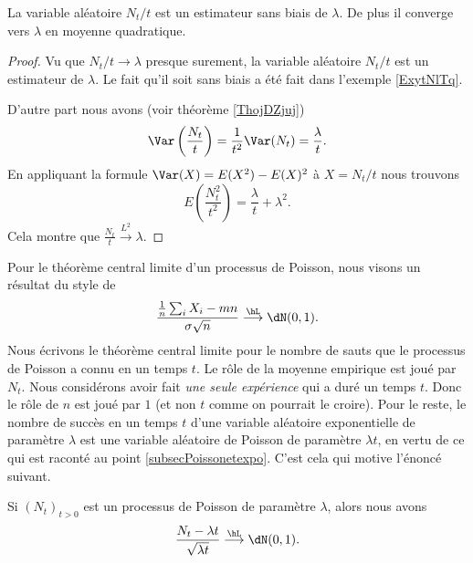 \begin{proposition}
    La variable aléatoire \( N_t/t\) est un estimateur sans biais de \( \lambda\). De plus il converge vers \( \lambda\) en moyenne quadratique.
\end{proposition}

\begin{proof}
    Vu que \( N_t/t\to\lambda\) presque surement, la variable aléatoire \( N_t/t\) est un estimateur de \( \lambda\). Le fait qu'il soit sans biais a été fait dans l'exemple \ref{ExytNlTq}.

    D'autre part nous avons (voir théorème \ref{ThojDZjuj})
    \begin{equation}
        \Var\left( \frac{ N_t }{ t } \right)=\frac{1}{ t^2 }\Var(N_t)=\frac{ \lambda }{ t }.
    \end{equation}
    En appliquant la formule \( \Var(X)=E(X^2)-E(X)^2\) à \( X=N_t/t\) nous trouvons
    \begin{equation}
        E\left( \frac{ N_t^2 }{ t^2 } \right)=\frac{ \lambda }{ t }+\lambda^2.
    \end{equation}
    Cela montre que \( \frac{ N_t }{ t }\stackrel{L^2}{\longrightarrow}\lambda\).
\end{proof}

Pour le théorème central limite d'un processus de Poisson, nous visons un résultat du style de
\begin{equation}
    \frac{ \frac{1}{ n }\sum_iX_i-mn }{ \sigma\sqrt{n} }\stackrel{\hL}{\longrightarrow}\dN(0,1).
\end{equation}
Nous écrivons le théorème central limite pour le nombre de sauts que le processus de Poisson a connu en un temps \( t\). Le rôle de la moyenne empirique est joué par \( N_t\). Nous considérons avoir fait \emph{une seule expérience} qui a duré un temps \( t\). Donc le rôle de \( n\) est joué par \( 1\) (et non \( t\) comme on pourrait le croire). Pour le reste, le nombre de succès en un temps \( t\) d'une variable aléatoire exponentielle de paramètre \( \lambda\) est une variable aléatoire de Poisson de paramètre \( \lambda t\), en vertu de ce qui est raconté au point \ref{subsecPoissonetexpo}. C'est cela qui motive l'énoncé suivant.

\begin{theorem}  \label{ThoCSuLLo}
    Si \( (N_t)_{t>0}\) est un processus de Poisson de paramètre \( \lambda\), alors nous avons
    \begin{equation}
        \frac{ N_t-\lambda t }{ \sqrt{\lambda t} }\stackrel{\hL}{\longrightarrow}\dN(0,1).
    \end{equation}
\end{theorem}

